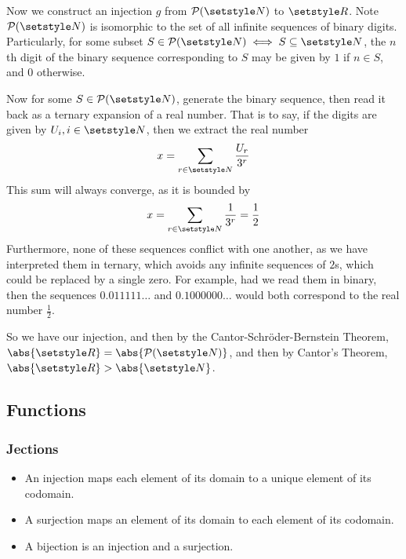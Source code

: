 Now we construct an injection \(g\) from \(\PowerSet(\Naturals)\) to \(\Reals\).
Note \(\PowerSet(\Naturals)\) is isomorphic to the set of all infinite sequences
of binary digits. Particularly, for some subset
\(S \in \PowerSet(\Naturals) \iff S \subseteq \Naturals\), the \(n\)th digit of
the binary sequence corresponding to \(S\) may be given by \(1\) if \(n \in S\),
and \(0\) otherwise.

Now for some \(S \in \PowerSet(\Naturals)\), generate the binary sequence, then
read it back as a ternary expansion of a real number. That is to say, if the
digits are given by \(U_i, i \in \Naturals\), then we extract the real number
\begin{equation*}
 x = \sum_{r \in \Naturals} \frac{U_r}{3^r}
\end{equation*}
This sum will always converge, as it is bounded by
\begin{equation*}
 x = \sum_{r \in \Naturals} \frac 1{3^r} = \frac 12
\end{equation*}
Furthermore, none of these sequences conflict with one another, as we have
interpreted them in ternary, which avoids any infinite sequences of \(2\)s,
which could be replaced by a single zero. For example, had we read them in
binary, then the sequences \(0.011111\ldots\) and \(0.1000000\ldots\) would both
correspond to the real number \(\frac 12\).

So we have our injection, and then by the Cantor-Schr\"oder-Bernstein Theorem,
\(\abs{\Reals} = \abs{\PowerSet(\Naturals)}\), and then by Cantor's Theorem,
\(\abs{\Reals} > \abs{\Naturals}\).


\subsection{Functions}


\subsubsection{Jections}


\begin{itemize}
 \item An injection maps each element of its domain to a unique element of
       its codomain.
 \item A surjection maps an element of its domain to each element of its
       codomain.
 \item A bijection is an injection and a surjection.
\end{itemize}
